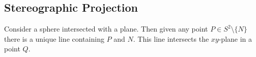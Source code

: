 \begin{center}
\end{center}























\subsection{Stereographic Projection}


Consider a sphere intersected with a plane. Then given any point $P \in S^2\setminus \{ N \}$ there is a unique line containing $P$ and $N$. This line intersects the $xy$-plane in a point $Q$.













